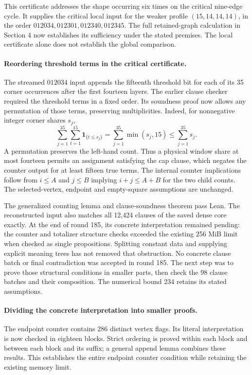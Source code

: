 \documentclass[11pt,a4paper]{article}
\begin{document}
This certificate addresses the shape occurring six times on the critical
nine-edge cycle. It supplies the critical local input for the weaker profile $(15,14,14,14)$,
in the order $012034,012301,012340,012345$. The full retained-graph calculation in Section 4 now establishes its
sufficiency under the stated premises. The local certificate alone
does not establish the global comparison.

\paragraph{Reordering threshold terms in the critical certificate.}
The streamed $012034$ input appends the fifteenth threshold bit for each
of its 35 corner occurrences after the first fourteen layers. The earlier
clause checker required the threshold terms in a fixed order. Its
soundness proof now allows any permutation of those terms, preserving
multiplicities. Indeed, for nonnegative integer corner shares $s_j$,
\[
\sum_{j=1}^{35}\sum_{t=1}^{15}\mathbf{1}_{\{t\le s_j\}}
 =\sum_{j=1}^{35}\min(s_j,15)\le\sum_{j=1}^{35}s_j.
\]
A permutation preserves the left-hand count. Thus a physical window
share at most fourteen permits an assignment satisfying the cap clause,
which negates the counter output for at least fifteen true terms.
The internal counter implications follow from
$i\le A$ and $j\le B$ implying $i+j\le A+B$ for the two child counts.
The selected-vertex, endpoint and empty-square assumptions are unchanged.

The generalized counting lemma and clause-soundness theorem pass Lean.
The reconstructed input also matches all 12,424 clauses of the saved
dense core exactly. At the end of round 185, its concrete interpretation remained
pending: the counter and totalizer structure checks exceeded the existing
256 MiB limit when checked as single propositions. Splitting constant
data and supplying explicit meaning trees has not removed that
obstruction. No concrete clause batch or final contradiction was
accepted in round 185. The next step was to prove those structural
conditions in smaller parts, then check the 98 clause batches and their
composition. The numerical bound 234 retains its stated assumptions.

\paragraph{Dividing the concrete interpretation into smaller proofs.}
The endpoint counter contains 286 distinct vertex flags. Its literal
interpretation is now checked in eighteen blocks. Strict ordering is
proved within each block and between each block and its suffix; a general
append lemma combines these results. This establishes the entire endpoint
counter condition while retaining the existing memory limit.
\end{document}
